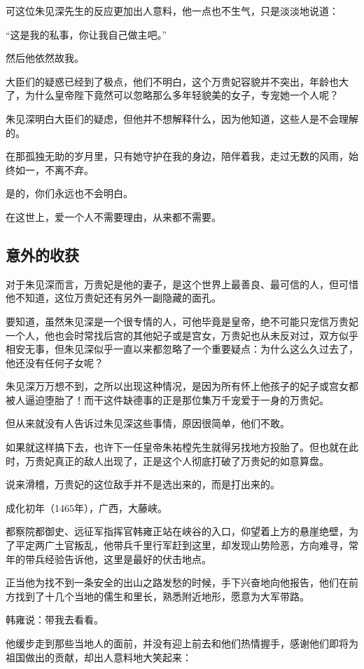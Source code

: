 \begin{multicols}{\theparacolNo}
		可这位朱见深先生的反应更加出人意料，他一点也不生气，只是淡淡地说道：

		“这是我的私事，你让我自己做主吧。”

		然后他依然故我。

		大臣们的疑惑已经到了极点，他们不明白，这个万贵妃容貌并不突出，年龄也大了，为什么皇帝陛下竟然可以忽略那么多年轻貌美的女子，专宠她一个人呢？

		朱见深明白大臣们的疑虑，但他并不想解释什么，因为他知道，这些人是不会理解的。

		在那孤独无助的岁月里，只有她守护在我的身边，陪伴着我，走过无数的风雨，始终如一，不离不弃。

		是的，你们永远也不会明白。

		在这世上，爱一个人不需要理由，从来都不需要。

		\subsection{意外的收获}
		对于朱见深而言，万贵妃是他的妻子，是这个世界上最善良、最可信的人，但可惜他不知道，这位万贵妃还有另外一副隐藏的面孔。

		要知道，虽然朱见深是一个很专情的人，可他毕竟是皇帝，绝不可能只宠信万贵妃一个人，他也会时常找后宫的其他妃子或是宫女，万贵妃也从未反对过，双方似乎相安无事，但朱见深似乎一直以来都忽略了一个重要疑点：为什么这么久过去了，他还没有任何子女呢？

		朱见深万万想不到，之所以出现这种情况，是因为所有怀上他孩子的妃子或宫女都被人逼迫堕胎了！而干这件缺德事的正是那位集万千宠爱于一身的万贵妃。

		但从来就没有人告诉过朱见深这些事情，原因很简单，他们不敢。

		如果就这样搞下去，也许下一任皇帝朱祐樘先生就得另找地方投胎了。但也就在此时，万贵妃真正的敌人出现了，正是这个人彻底打破了万贵妃的如意算盘。

		说来滑稽，万贵妃的这位敌手并不是选出来的，而是打出来的。

		成化初年（1465年），广西，大藤峡。

		都察院都御史、远征军指挥官韩雍正站在峡谷的入口，仰望着上方的悬崖绝壁，为了平定两广土官叛乱，他带兵千里行军赶到这里，却发现山势险恶，方向难寻，常年的带兵经验告诉他，这里是最好的伏击地点。

		正当他为找不到一条安全的出山之路发愁的时候，手下兴奋地向他报告，他们在前方找到了十几个当地的儒生和里长，熟悉附近地形，愿意为大军带路。

		韩雍说：带我去看看。

		他缓步走到那些当地人的面前，并没有迎上前去和他们热情握手，感谢他们即将为祖国做出的贡献，却出人意料地大笑起来：


\end{multicols}
